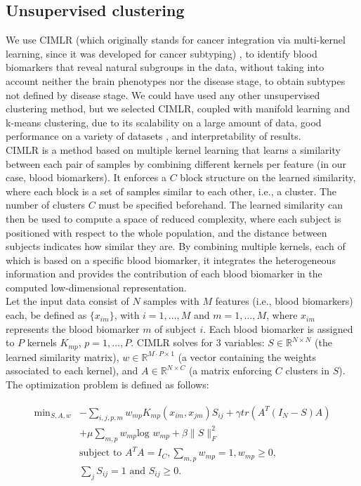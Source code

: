 \subsection{Unsupervised clustering}

We use CIMLR (which originally stands for cancer integration via multi-kernel learning, since it was developed for cancer subtyping) \cite{Ramazzotti2018,Wang2017a}, to identify blood biomarkers that reveal natural subgroups in the data, without taking into account neither the brain phenotypes nor the disease stage, to obtain subtypes not defined by disease stage. We could have used any other unsupervised clustering method, but we selected CIMLR, coupled with manifold learning and k-means clustering, due to its scalability on a large amount of data, good performance on a variety of datasets \cite{Ramazzotti2018,Wang2017a}, and interpretability of results. \\

CIMLR is a method based on multiple kernel learning that learns a similarity between each pair of samples by combining different kernels per feature (in our case, blood biomarkers). It enforces a $C$ block structure on the learned similarity, where each block is a set of samples similar to each other, i.e., a cluster. The number of clusters $C$ must be specified beforehand. The learned similarity can then be used to compute a space of reduced complexity, where each subject is positioned with respect to the whole population, and the distance between subjects indicates how similar they are. By combining multiple kernels, each of which is based on a specific blood biomarker, it integrates the heterogeneous information and provides the contribution of each blood biomarker in the computed low-dimensional representation. \\

Let the input data consist of $N$ samples with $M$ features (i.e., blood biomarkers) each, be defined as $\{x_{im}\}$, with $i=1,\ldots, M$ and $m=1,\ldots, M$, where $x_{im}$ represents the blood biomarker $m$ of subject $i$. Each blood biomarker is assigned to $P$ kernels $K_{mp}$, $p=1,\ldots, P$. CIMLR solves for 3 variables: $S \in \mathbb{R}^{N\times N}$ (the learned similarity matrix), $w \in \mathbb{R}^{M\cdot P \times 1}$ (a vector containing the weights associated to each kernel), and $A \in \mathbb{R}^{N\times C}$ (a matrix enforcing $C$ clusters in $S$). The  optimization problem is defined as follows:

\begin{align}
\begin{split}\label{eq:1}
   \text{min}_{S,A,w} {}&-\sum_{i,j,p,m}w_{mp}K_{mp}(x_{im},x_{jm})S_{ij} + \gamma tr(A^T(I_N-S)A)\\
   {}&+ \mu\sum_{m,p} w_{mp} \text{log } w_{mp} + \beta \|S\|^2_F  \\
   {}&\text{subject to } A^TA = I_C, \sum_{m,p}  w_{mp} = 1,  w_{mp} \geq 0,\\
   {}&\sum_j S_{ij} = 1 \text{ and } S_{ij} \geq 0.
\end{split}
\end{align}

